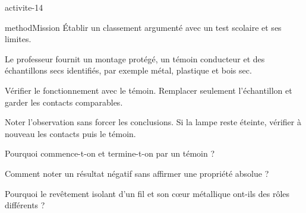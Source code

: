 \documentclass[12pt,twoside,openany]{book}
\begin{document}
\label{ch-14-activite}
\begin{pcFiche}{activite-14}
\begin{pcEncadre}{method}{Mission}
Établir un classement argumenté avec un test scolaire et ses limites.\par
\end{pcEncadre}
\begin{questions}
\item Le professeur fournit un montage protégé, un témoin conducteur et des échantillons secs identifiés, par exemple métal, plastique et bois sec.
\item Vérifier le fonctionnement avec le témoin. Remplacer seulement l’échantillon et garder les contacts comparables.
\item Noter l’observation sans forcer les conclusions. Si la lampe reste éteinte, vérifier à nouveau les contacts puis le témoin.
\end{questions}
\begin{questions}
\item Pourquoi commence-t-on et termine-t-on par un témoin ?
\item Comment noter un résultat négatif sans affirmer une propriété absolue ?
\item Pourquoi le revêtement isolant d’un fil et son cœur métallique ont-ils des rôles différents ?
\end{questions}
\end{pcFiche}
\label{ch-14-bilan}
\end{document}
